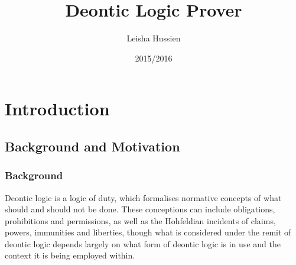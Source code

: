 \documentclass{l4proj}
\begin{document}
\title{Deontic Logic Prover}
\author{Leisha Hussien}
\date{2015/2016}
\maketitle

\begin{abstract}

\end{abstract}

\educationalconsent

\tableofcontents













\chapter{Introduction}

\section{Background and Motivation}%
\subsection{Background}
Deontic logic is a logic of duty, which formalises normative concepts of what should and should not be done. These conceptions can include obligations, prohibitions and permissions, as well as the Hohfeldian incidents\cite{Hohfeld} of claims, powers, immunities and liberties, though what is considered under the remit of deontic logic depends largely on what form of deontic logic is in use and the context it is being employed within. 
\end{document}
